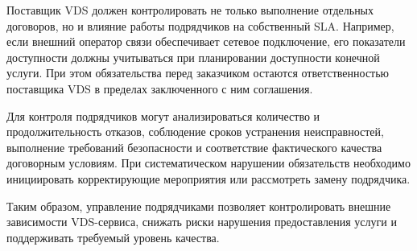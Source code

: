 \documentclass[14pt,a4paper]{extarticle}
\begin{document}
Поставщик VDS должен контролировать не только выполнение отдельных договоров, но
и влияние работы подрядчиков на собственный SLA. Например, если внешний оператор
связи обеспечивает сетевое подключение, его показатели доступности должны
учитываться при планировании доступности конечной услуги. При этом обязательства
перед заказчиком остаются ответственностью поставщика VDS в пределах заключенного
с ним соглашения.

Для контроля подрядчиков могут анализироваться количество и продолжительность
отказов, соблюдение сроков устранения неисправностей, выполнение требований
безопасности и соответствие фактического качества договорным условиям. При
систематическом нарушении обязательств необходимо инициировать корректирующие
мероприятия или рассмотреть замену подрядчика.

Таким образом, управление подрядчиками позволяет контролировать внешние
зависимости VDS-сервиса, снижать риски нарушения предоставления услуги и
поддерживать требуемый уровень качества.
\end{document}
